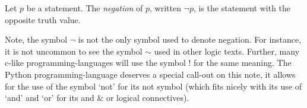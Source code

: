 \guard





\begin{defn}
\label{defn:negationOfStatement}
  Let $p$ be a statement.
  The \emph{negation} of $p$, written $\neg p$, is the statement with the opposite truth value.
\end{defn}

Note, the symbol $\neg$ is not the only symbol used to denote negation.
For instance, it is not uncommon to see the symbol $\sim$ used in other logic texts.
Further, many c-like programming-languages will use the symbol $!$ for the same meaning.
The Python programming-language deserves a special call-out on this note, it allows for the use of the symbol `not' for its not symbol (which fits nicely with its use of `and' and `or' for its and \& or logical connectives).
